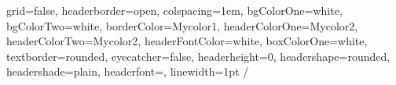\documentclass[a0paper,portrait]{baposter}
\begin{document}
\begin{poster}
{
grid=false,
headerborder=open, %
colspacing=1em, %
bgColorOne=white, %
bgColorTwo=white, %
borderColor=Mycolor1, %
headerColorOne=Mycolor2, %
headerColorTwo=Mycolor2, %
headerFontColor=white, %
boxColorOne=white, %
textborder=rounded, %
eyecatcher=false, %
headerheight=0\textheight, %
headershape=rounded, %
headershade=plain,
headerfont=\Large\textsf, %
linewidth=1pt %
}/
{}
{\textsf{{}}} %
\hfill \break %


\end{poster}
\end{document}

